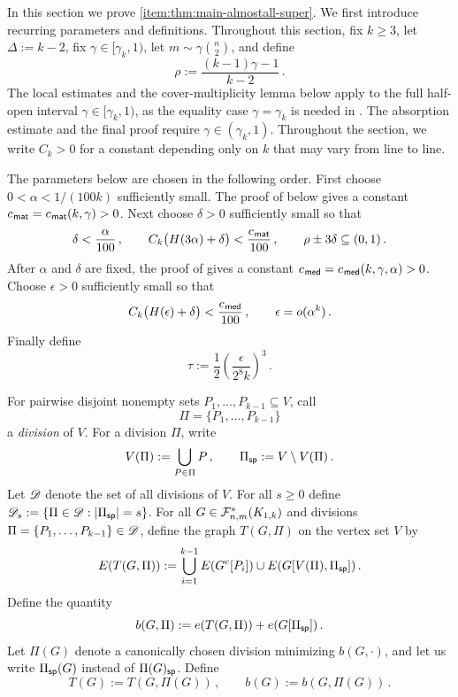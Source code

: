 In this section we prove  \ref{item:thm:main-almostall-super}. We first introduce recurring parameters and definitions. Throughout this section, fix $k\geq3$, let $\Delta:=k-2$, fix $\gamma\in[\gamma_k,1)$, let $m\sim\gamma\binom{n}{2}$, and define
$$\rho:=\frac{(k-1)\gamma-1}{k-2}\,.$$
The local estimates and the cover-multiplicity lemma below apply to the full half-open interval $\gamma\in[\gamma_k,1)$, as the equality case $\gamma=\gamma_k$ is needed in . The absorption estimate and the final proof require $\gamma\in(\gamma_k,1)$. Throughout the section, we write $C_k>0$ for a constant depending only on $k$ that may vary from line to line.

The parameters below are chosen in the following order. First choose $0<\alpha<1/(100k)$ sufficiently small. The proof of  below gives a constant $c_{\hspace{0.2mm}\mathsf{mat}}=c_{\hspace{0.2mm}\mathsf{mat}}(k,\gamma)>0$. Next choose $\delta>0$ sufficiently small so that
\begin{equation}\label{eqn:super-parameter-alpha-delta-K1k}
\delta<\frac{\alpha}{100}\,,\qquad C_k\bigl(H(3\alpha)+\delta\bigr)<\frac{c_{\hspace{0.2mm}\mathsf{mat}}}{100}\,,\qquad \rho\pm3\delta\subseteq(0,1)\,.
\end{equation}
After $\alpha$ and $\delta$ are fixed, the proof of  gives a constant $c_{\hspace{0.2mm}\mathsf{med}}=c_{\hspace{0.2mm}\mathsf{med}}(k,\gamma,\alpha)>0$. Choose $\epsilon>0$ sufficiently small so that
\begin{equation}\label{eqn:super-parameter-epsilon-K1k}
C_k\bigl(H(\epsilon)+\delta\bigr)<\frac{c_{\hspace{0.2mm}\mathsf{med}}}{100}\,,\qquad \epsilon=o(\alpha^k)\,.
\end{equation}
Finally define
$$\tau:=\frac{1}{2}\left(\frac{\epsilon}{2^8k}\right)^3\,.$$

For pairwise disjoint nonempty sets $P_1,\dots,P_{k-1}\subseteq V$, call
$$\Pi=\{P_1,\dots,P_{k-1}\}$$
a \emph{division} of $V$. For a division $\Pi$, write
$$V(\Pi):=\bigcup_{P\in\Pi}P\,,\qquad \Pi_{\mathsf{sp}}:=V\setminus V(\Pi)\,.$$
Let ${\mathscr D}$ denote the set of all divisions of $V$. For all $s\geq0$ define ${\mathscr D}_s:=\{\Pi\in{\mathscr D}:|\Pi_{\mathsf{sp}}|=s\}$.
For all $G\in{\mathcal F}^\ast_{n,m}(K_{1,k})$ and divisions $\Pi=\{P_1,\dots,P_{k-1}\}\in{\mathscr D}$, define the graph $T(G,\Pi)$ on the vertex set $V$ by
$$E(T(G,\Pi)):=\bigcup_{i=1}^{k-1}E(G^c[P_i])\cup E(G[V(\Pi),\Pi_{\mathsf{sp}}])\,.$$
Define the quantity
$$b(G,\Pi):=e(T(G,\Pi))+e(G[\Pi_{\mathsf{sp}}])\,.$$
Let $\Pi(G)$ denote a canonically chosen division minimizing $b(G,\cdot)$, and let us write $\Pi_{\mathsf{sp}}(G)$ instead of $\Pi(G)_{\mathsf{sp}}$. Define
$$T(G):=T(G,\Pi(G))\,,\qquad b(G):=b(G,\Pi(G))\,.$$

